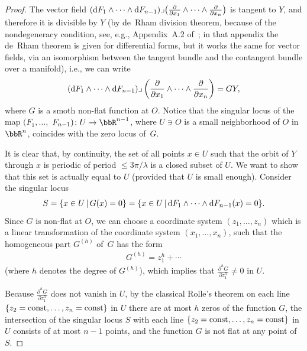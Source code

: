 \begin{proof}
 The vector f\/ield $({\rm d}F_1 \wedge \dots \wedge {\rm d}F_{n-1})
\lrcorner \big(\frac{\partial}{\partial x_1} \wedge \dots \wedge \frac{\partial}{\partial x_n}\big)$
is tangent to $Y$, and therefore it is divisible by $Y$ (by de~Rham division theorem,
because of the nondegeneracy condition, see, e.g., Appendix~A.2 of~\cite{DufourZung-Poisson2005}; in that appendix the de~Rham theorem is given
for dif\/ferential forms, but it works the same for vector f\/ields, via an isomorphism between the tangent bundle and the contangent bundle over
a manifold), i.e., we can write
\begin{gather} \label{eqn:3-3}
 ({\rm d}F_1 \wedge \dots \wedge {\rm d}F_{n-1})
\lrcorner \left(\frac{\partial}{\partial x_1} \wedge \dots \wedge \frac{\partial}{\partial x_n}\right) = GY,
\end{gather}
where $G$ is a smoth non-f\/lat function at $O$. Notice that the singular locus of the map $(F_1,\dots,$ $F_{n-1})\colon U \to \bbR^{n-1}$,
where $U \ni O$ is a small neighborhood of $O$ in $\bbR^n$, coincides with the zero locus of~$G$.

It is clear that, by continuity, the set of all points $x \in U$ such that the orbit of $Y$ through $x$ is periodic of period $\leq 3\pi/\lambda$
is a closed subset of $U$. We want to show that this set is actually equal to $U$ (provided that $U$ is small enough).
Consider the singular locus
\begin{gather*}
 S = \{x \in U \, | \,G(x) = 0 \} = \{x \in U \, | \,{\rm d}F_1 \wedge \dots \wedge {\rm d}F_{n-1} (x) = 0 \}.
\end{gather*}
Since $G$ is non-f\/lat at $O$, we can choose a coordinate system $(z_1,\dots, z_n)$ which is a linear transformation of the
coordinate system $(x_1,\dots,x_n)$, such that the homogeneous part $G^{(h)}$ of~$G$ has the form
\begin{gather} \label{eqn:3-5}
 G^{(h)} = z_1^h + \cdots
\end{gather}
(where $h$ denotes the degree of $G^{(h)}$), which implies that $\frac{\partial^h G}{\partial z_1^h} \neq 0$ in $U$.

Because $\frac{\partial^h G}{\partial z_1^h}$ does not vanish in $U$, by the classical Rolle's theorem on each line $\{z_2={\rm const}, \dots, z_n = {\rm const}\}$ in $U$ there are at most $h$ zeros of the function $G$, the intersection of the singular locus $S$ with each line $\{z_2={\rm const}, \dots, z_n = {\rm const}\}$ in $U$ consists of at most $n-1$ points, and the function $G$ is not f\/lat at any point of $S$.


\end{proof}
